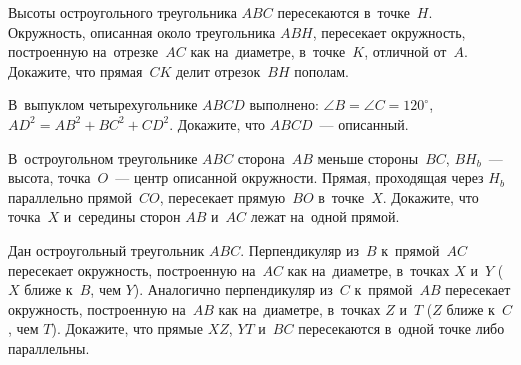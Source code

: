 \begin{problems}
\item
Высоты остроугольного треугольника $ABC$ пересекаются в~точке~$H$.
Окружность, описанная около треугольника $ABH$, пересекает окружность,
построенную на~отрезке~$AC$ как на~диаметре, в~точке~$K$, отличной от~$A$.
Докажите, что прямая~$CK$ делит отрезок~$BH$ пополам.

\item
В~выпуклом четырехугольнике $ABCD$ выполнено:
$\angle B = \angle C = 120^{\circ}$, $AD^2 = AB^2 + BC^2 + CD^2$.
Докажите, что $ABCD$~--- описанный.

\item
В~остроугольном треугольнике $ABC$ сторона~$AB$ меньше стороны~$BC$,
$B H_{b}$~--- высота, точка~$O$~--- центр описанной окружности.
Прямая, проходящая через $H_{b}$ параллельно прямой~$CO$, пересекает
прямую~$BO$ в~точке~$X$.
Докажите, что точка~$X$ и~середины сторон $AB$ и~$AC$ лежат на~одной прямой.



\item
Дан остроугольный треугольник $ABC$.
Перпендикуляр из~$B$ к~прямой~$AC$ пересекает окружность, построенную на~$AC$
как на~диаметре, в~точках $X$ и~$Y$ ($X$ ближе к~$B$, чем $Y$).
Аналогично перпендикуляр из~$C$ к~прямой~$AB$ пересекает окружность,
построенную на~$AB$ как на~диаметре, в~точках $Z$ и~$T$
($Z$ ближе к~$C$, чем $T$).
Докажите, что прямые $XZ$, $YT$ и~$BC$ пересекаются в~одной точке либо
параллельны.



\end{problems}
